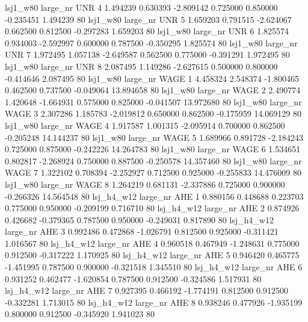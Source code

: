     lsj1_w80   large_nr      UNR                 4  1.494239  0.630393  -2.809142 0.725000 0.850000 -0.235451    1.494239 80
    lsj1_w80   large_nr      UNR                 5  1.659203  0.791515  -2.624067 0.662500 0.812500 -0.297283    1.659203 80
    lsj1_w80   large_nr      UNR                 6  1.825574  0.934003  -2.592997 0.600000 0.787500 -0.350295    1.825574 80
    lsj1_w80   large_nr      UNR                 7  1.972495  1.057138  -2.649587 0.562500 0.775000 -0.391291    1.972495 80
    lsj1_w80   large_nr      UNR                 8  2.087495  1.149286  -2.627615 0.500000 0.800000 -0.414646    2.087495 80
    lsj1_w80   large_nr     WAGE                 1  4.458324  2.548374  -1.800465 0.462500 0.737500 -0.049064   13.894658 80
    lsj1_w80   large_nr     WAGE                 2  2.490774  1.420648  -1.664931 0.575000 0.825000 -0.041507   13.972680 80
    lsj1_w80   large_nr     WAGE                 3  2.307286  1.185783  -2.019812 0.650000 0.862500 -0.175959   14.069129 80
    lsj1_w80   large_nr     WAGE                 4  1.917587  1.001315  -2.095914 0.700000 0.862500 -0.205248   14.144237 80
    lsj1_w80   large_nr     WAGE                 5  1.689966  0.891728  -2.184243 0.725000 0.875000 -0.242226   14.264783 80
    lsj1_w80   large_nr     WAGE                 6  1.534651  0.802817  -2.268924 0.750000 0.887500 -0.250578   14.357460 80
    lsj1_w80   large_nr     WAGE                 7  1.322102  0.708394  -2.252927 0.712500 0.925000 -0.255833   14.476009 80
    lsj1_w80   large_nr     WAGE                 8  1.264219  0.681131  -2.337886 0.725000 0.900000 -0.266326   14.564548 80
  lsj_h4_w12   large_nr      AHE                 1  0.880156  0.448688   0.223703 0.775000 0.950000 -0.209199    0.716710 80
  lsj_h4_w12   large_nr      AHE                 2  0.874926  0.426682  -0.379365 0.787500 0.950000 -0.249031    0.817890 80
  lsj_h4_w12   large_nr      AHE                 3  0.992486  0.472868  -1.026791 0.812500 0.925000 -0.311421    1.016567 80
  lsj_h4_w12   large_nr      AHE                 4  0.960518  0.467949  -1.248631 0.775000 0.912500 -0.317222    1.170925 80
  lsj_h4_w12   large_nr      AHE                 5  0.946420  0.465775  -1.451995 0.787500 0.900000 -0.321518    1.345510 80
  lsj_h4_w12   large_nr      AHE                 6  0.931252  0.462477  -1.620854 0.787500 0.912500 -0.324586    1.517931 80
  lsj_h4_w12   large_nr      AHE                 7  0.927395  0.466192  -1.774191 0.812500 0.912500 -0.332281    1.713015 80
  lsj_h4_w12   large_nr      AHE                 8  0.938246  0.477926  -1.935199 0.800000 0.912500 -0.345920    1.941023 80
